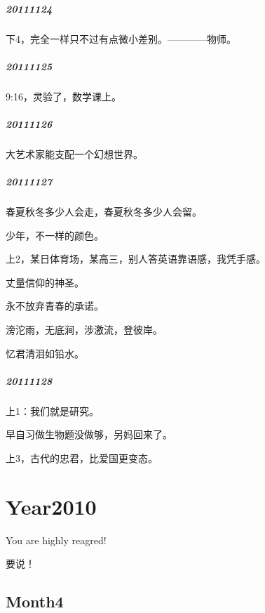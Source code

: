 \documentclass[UTF8]{book}
\begin{document}
\paragraph{20111124}

下4，完全一样只不过有点微小差别。————物师。


\paragraph{20111125}

9:16，灵验了，数学课上。


\paragraph{20111126}

大艺术家能支配一个幻想世界。


\paragraph{20111127}

春夏秋冬多少人会走，春夏秋冬多少人会留。

少年，不一样的颜色。

上2，某日体育场，某高三，别人答英语靠语感，我凭手感。

丈量信仰的神圣。

永不放弃青春的承诺。

滂沱雨，无底涧，涉激流，登彼岸。

忆君清泪如铅水。



\paragraph{20111128}

上1：我们就是研究。

早自习做生物题没做够，另妈回来了。

上3，古代的忠君，比爱国更变态。




\chapter{Year2010}

You are highly reagred!

要说！

\section{Month4}
\end{document}

